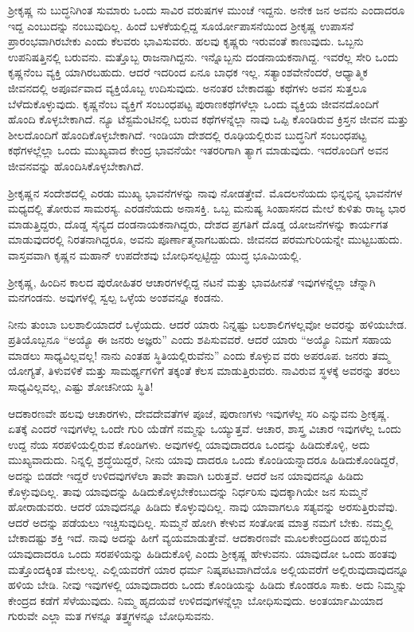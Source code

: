 ಶ‍್ರೀಕೃಷ್ಣ ನು ಬುದ್ಧನಿಗಿಂತ ಸುಮಾರು ಒಂದು ಸಾವಿರ ವರುಷಗಳ ಮುಂಚೆ ಇದ್ದನು. ಅನೇಕ ಜನ ಅವನು ಎಂದಾದರೂ ಇದ್ದ ಎಂಬುದನ್ನು ನಂಬುವುದಿಲ್ಲ. ಹಿಂದೆ ಬಳಕೆಯಲ್ಲಿದ್ದ ಸೂರ್ಯೋಪಾಸನೆಯಿಂದ ಶ‍್ರೀಕೃಷ್ಣ ಉಪಾಸನೆ ಪ್ರಾರಂಭವಾಗಿರಬೇಕು ಎಂದು ಕೆಲವರು ಭಾವಿಸುವರು. ಹಲವು ಕೃಷ್ಣರು ಇರುವಂತೆ ಕಾಣುವುದು. ಒಬ್ಬನು ಉಪನಿಷತ್ತಿನಲ್ಲಿ ಬರುವನು. ಮತ್ತೊಬ್ಬ ರಾಜನಾಗಿದ್ದನು. ಇನ್ನೊಬ್ಬನು ದಂಡನಾಯಕನಾಗಿದ್ದ. ಇವರೆಲ್ಲ ಸೇರಿ ಒಂದು ಕೃಷ್ಣನೆಂಬ ವ್ಯಕ್ತಿ ಯಾಗಿರಬಹುದು. ಆದರೆ ಇದರಿಂದ ಏನೂ ಬಾಧಕ ಇಲ್ಲ. ಸತ್ಯಾಂಶವೇನೆಂದರೆ, ಆಧ್ಯಾತ್ಮಿಕ ಜೀವನದಲ್ಲಿ ಅಪೂರ್ವವಾದ ವ್ಯಕ್ತಿಯೊಬ್ಬ ಉದಿಸುವುದು. ಅನಂತರ ಬೇಕಾದಷ್ಟು ಕಥೆಗಳು ಅವನ ಸುತ್ತಲೂ ಬೆಳೆದುಕೊಳ್ಳುವುದು. ಕೃಷ್ಣನೆಂಬ ವ್ಯಕ್ತಿಗೆ ಸಂಬಂಧಪಟ್ಟ ಪುರಾಣಕಥೆಗಳೆಲ್ಲಾ ಒಂದು ವ್ಯಕ್ತಿಯ ಜೀವನದೊಂದಿಗೆ ಹೊಂದಿ ಕೊಳ್ಳಬೇಕಾಗಿದೆ. ನ್ಯೂ ಟೆಸ್ಟಮೆಂಟಿನಲ್ಲಿ ಬರುವ ಕಥೆಗಳನ್ನೆಲ್ಲಾ ನಾವು ಒಪ್ಪಿ \-ಕೊಂಡಿರುವ ಕ್ರಿಸ್ತನ ಜೀವನ ಮತ್ತು ಶೀಲದೊಂದಿಗೆ ಹೊಂದಿಕೊಳ್ಳಬೇಕಾಗಿದೆ. ಇಂಡಿಯಾ ದೇಶದಲ್ಲಿ ರೂಢಿಯಲ್ಲಿರುವ ಬುದ್ಧನಿಗೆ ಸಂಬಂಧಪಟ್ಟ ಕಥೆಗಳಲ್ಲೆಲ್ಲಾ ಒಂದು ಮುಖ್ಯವಾದ ಕೇಂದ್ರ ಭಾವನೆಯೇ ಇತರರಿಗಾಗಿ ತ್ಯಾಗ ಮಾಡುವುದು. ಇದರೊಂದಿಗೆ ಅವನ ಜೀವನವನ್ನು ಹೊಂದಿಸಿಕೊಳ್ಳಬೇಕಾಗಿದೆ.

ಶ‍್ರೀಕೃಷ್ಣನ ಸಂದೇಶದಲ್ಲಿ ಎರಡು ಮುಖ್ಯ ಭಾವನೆಗಳನ್ನು ನಾವು ನೋಡತ್ತೇವೆ. ಮೊದಲನೆಯದು ಭಿನ್ನಭಿನ್ನ ಭಾವನೆಗಳ ಮಧ್ಯದಲ್ಲಿ ತೋರುವ ಸಾಮರಸ್ಯ. ಎರಡನೆಯದು ಅನಾಸಕ್ತಿ. ಒಬ್ಬ ಮನುಷ್ಯ ಸಿಂಹಾಸನದ ಮೇಲೆ ಕುಳಿತು ರಾಜ್ಯ ಭಾರ ಮಾಡುತ್ತಿದ್ದರು, ದೊಡ್ಡ ಸೈನ್ಯದ ದಂಡನಾಯಕನಾಗಿದ್ದರು, ದೇಶದ ಪ್ರಗತಿಗೆ ದೊಡ್ಡ ಯೋಜನೆಗಳನ್ನು ಕಾರ್ಯಗತ ಮಾಡುವುದರಲ್ಲಿ ನಿರತನಾಗಿದ್ದರೂ, ಅವನು ಪೂರ್ಣಾತ್ಮನಾಗಬಹುದು. ಜೀವನದ ಪರಮಗುರಿಯನ್ನೇ ಮುಟ್ಟಬಹುದು. ವಾಸ್ತವವಾಗಿ ಕೃಷ್ಣನ ಮಹಾನ್​ ಉಪದೇಶವು ಬೋಧಿಸಲ್ಪಟ್ಟಿದ್ದು ಯುದ್ಧ ಭೂಮಿಯಲ್ಲಿ.

ಶ‍್ರೀಕೃಷ್ಣ, ಹಿಂದಿನ ಕಾಲದ ಪುರೋಹಿತರ ಆಚಾರಗಳಲ್ಲಿದ್ದ ನಟನೆ ಮತ್ತು ಭಾವಹೀನತೆ ಇವುಗಳನ್ನೆಲ್ಲಾ ಚೆನ್ನಾಗಿ ಮನಗಂಡನು. ಅವುಗಳಲ್ಲಿ ಸ್ವಲ್ಪ ಒಳ್ಳೆಯ ಅಂಶವನ್ನೂ ಕಂಡನು.

ನೀನು ತುಂಬಾ ಬಲಶಾಲಿಯಾದರೆ ಒಳ್ಳೆಯದು. ಆದರೆ ಯಾರು ನಿನ್ನಷ್ಟು ಬಲಶಾಲಿಗಳಲ್ಲವೋ ಅವರನ್ನು ಹಳಿಯಬೇಡ. ಪ್ರತಿಯೊಬ್ಬನೂ “ಅಯ್ಯೊ ಈ ಜನರು ಅಜ್ಞರು” ಎಂದು ಶಪಿಸುವವರೆ. ಆದರೆ ಯಾರು “ಅಯ್ಯೊ ನಿಮಗೆ ಸಹಾಯ ಮಾಡಲು ಸಾಧ್ಯವಿಲ್ಲವಲ್ಲ! ನಾನು ಎಂತಹ ಸ್ಥಿತಿಯಲ್ಲಿರುವೆನು” ಎಂದು ಕೊಳ್ಳುವ ವರು ಅಪರೂಪ. ಜನರು ತಮ್ಮ ಯೋಗ್ಯತೆ, ತಿಳುವಳಿಕೆ ಮತ್ತು ಸಾಮರ್ಥ್ಯಗಳಿಗೆ ತಕ್ಕಂತೆ ಕೆಲಸ ಮಾಡುತ್ತಿರುವರು. ನಾವಿರುವ ಸ್ಥಳಕ್ಕೆ ಅವರನ್ನು ತರಲು ಸಾಧ್ಯವಿಲ್ಲವಲ್ಲ, ಎಷ್ಟು ಶೋಚನೀಯ ಸ್ಥಿತಿ!

ಆದಕಾರಣವೇ ಹಲವು ಆಚಾರಗಳು, ದೇವದೇವತೆಗಳ ಪೂಜೆ, ಪುರಾಣಗಳು ಇವುಗಳೆಲ್ಲ ಸರಿ ಎನ್ನುವನು ಶ‍್ರೀಕೃಷ್ಣ. ಏತಕ್ಕೆ ಎಂದರೆ ಇವುಗಳೆಲ್ಲ ಒಂದೇ ಗುರಿ ಯೆಡೆಗೆ ನಮ್ಮನ್ನು ಒಯ್ಯುತ್ತವೆ. ಆಚಾರ, ಶಾಸ್ತ್ರ ವಿಚಾರ ಇವುಗಳೆಲ್ಲ ಒಂದು ಉದ್ದ ನೆಯ ಸರಪಳಿಯಲ್ಲಿರುವ ಕೊಂಡಿಗಳು. ಅವುಗಳಲ್ಲಿ ಯಾವುದಾದರೂ ಒಂದನ್ನು ಹಿಡಿದುಕೊಳ್ಳಿ, ಅದು ಮುಖ್ಯವಾದುದು. ನಿನ್ನಲ್ಲಿ ಶ್ರದ್ಧೆಯಿದ್ದರೆ, ನೀನು ಯಾವು ದಾದರೂ ಒಂದು ಕೊಂಡಿಯನ್ನಾದರೂ ಹಿಡಿದುಕೊಂಡಿದ್ದರೆ, ಅದನ್ನು ಬಿಡದೇ ಇದ್ದರೆ ಉಳಿದವುಗಳೆಲಾ ತಾವೇ ತಾವಾಗಿ ಬರುತ್ತವೆ. ಆದರೆ ಜನ ಯಾವುದನ್ನೂ ಹಿಡಿದು ಕೊಳ್ಳುವುದಿಲ್ಲ. ತಾವು ಯಾವುದನ್ನು ಹಿಡಿದುಕೊಳ್ಳಬೇಕೆಂಬುದನ್ನು ನಿರ್ಧರಿಸು ವುದಕ್ಕಾಗಿಯೇ ಜನ ಸುಮ್ಮನೆ ಹೋರಾಡುವರು. ಆದರೆ ಯಾವುದನ್ನೂ ಹಿಡಿದು ಕೊಳ್ಳುವುದಿಲ್ಲ. ನಾವು ಯಾವಾಗಲೂ ಸತ್ಯವನ್ನು ಅರಸುತ್ತಿರುವೆವು. ಆದರೆ ಅದನ್ನು ಪಡೆಯಲು ಇಚ್ಚಿಸುವುದಿಲ್ಲ. ಸುಮ್ಮನೆ ಹೋಗಿ ಕೇಳುವ ಸಂತೋಷ ಮಾತ್ರ ನಮಗೆ ಬೇಕು. ನಮ್ಮಲ್ಲಿ ಬೇಕಾದಷ್ಟು ಶಕ್ತಿ ಇದೆ. ನಾವು ಅದನ್ನು ಹೀಗೆ ವ್ಯಯಮಾಡುತ್ತೇವೆ. ಆದಕಾರಣವೇ ಮೂಲಕೇಂದ್ರದಿಂದ ಹಬ್ಬಿರುವ ಯಾವುದಾದರೂ ಒಂದು ಸರಪಳಿಯನ್ನು ಹಿಡಿದುಕೊಳ್ಳಿ ಎಂದು ಶ‍್ರೀಕೃಷ್ಣ ಹೇಳುವನು. ಯಾವುದೋ ಒಂದು ಹಂತವು ಮತ್ತೊಂದಕ್ಕಿಂತ ಮೇಲಲ್ಲ. ಎಲ್ಲಿಯವರೆಗೆ ಯಾರ ಧರ್ಮ ನಿಷ್ಕಪಟವಾಗಿದೆಯೊ ಅಲ್ಲಿಯವರೆಗೆ ಅಲ್ಲಿರುವುದಾವುದನ್ನೂ ಹಳಿಯ ಬೇಡಿ. ನೀವು ಇವುಗಳಲ್ಲಿ ಯಾವುದಾದರು ಒಂದು ಕೊಂಡಿಯನ್ನು ಹಿಡಿದು ಕೊಂಡರೂ ಸಾಕು. ಅದು ನಿಮ್ಮನ್ನು ಕೇಂದ್ರದ ಕಡೆಗೆ ಸೆಳೆಯುವುದು. ನಿಮ್ಮ ಹೃದಯವೆ ಉಳಿದವುಗಳನ್ನೆಲ್ಲಾ ಬೋಧಿಸುವುದು. ಅಂತರ್ಯಾಮಿಯಾದ ಗುರುವೇ ಎಲ್ಲಾ ಮತ ಗಳನ್ನೂ ತತ್ತ್ವಗಳನ್ನೂ ಬೋಧಿಸುವನು.

